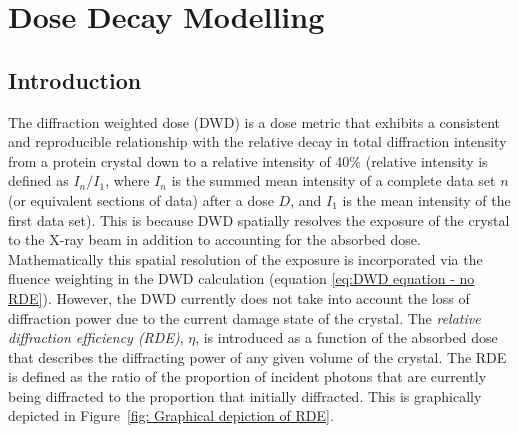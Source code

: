\chapter{Dose Decay Modelling}
\label{chap:Dose Decay Modelling}

\section{Introduction}
\label{sec:Introduction - Dose Decay Modelling}

The diffraction weighted dose (DWD) is a dose metric that exhibits a consistent and reproducible relationship with the relative decay in total diffraction intensity from a protein crystal down to a relative intensity of 40\% \cite{zeldin2013dwd} (relative intensity is defined as $I_n/I_1$, where $I_n$ is the summed mean intensity of a complete data set $n$ (or equivalent sections of data) after a dose $D$, and $I_1$ is the mean intensity of the first data set).
This is because DWD spatially resolves the exposure of the crystal to the X-ray beam in addition to accounting for the absorbed dose.
Mathematically this spatial resolution of the exposure is incorporated via the fluence weighting in the DWD calculation (equation \ref{eq:DWD equation - no RDE}).
However, the DWD currently does not take into account the loss of diffraction power due to the current damage state of the crystal.
The \textit{relative diffraction efficiency (RDE)}, $\eta$, is introduced as a function of the absorbed dose that describes the diffracting power of any given volume of the crystal.
The RDE is defined as the ratio of the proportion of incident photons that are currently being diffracted to the proportion that initially diffracted.
This is graphically depicted in Figure~\ref{fig: Graphical depiction of RDE}.
